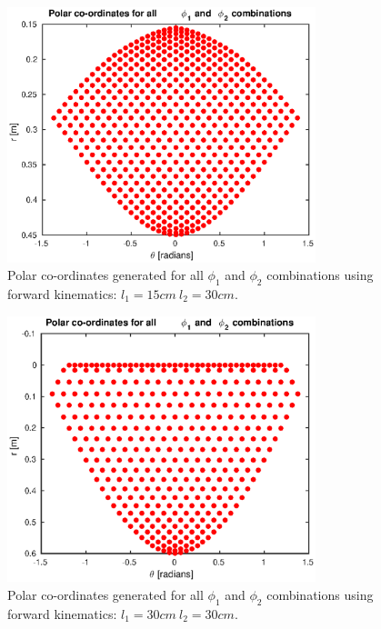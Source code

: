 \begin{figure}
\centering
\includegraphics[width=0.8\textwidth]{images/geometry/forward-kinematic-leg-positions.eps}
\caption{Polar co-ordinates generated for all $\phi_1$ and $\phi_2$ combinations using forward kinematics: $l_1 = 15cm\ l_2 = 30cm$.}
\label{fig:Polar co-ordinates generated 15-30}
\end{figure}

\begin{figure}
\centering
\includegraphics[width=0.8\textwidth]{images/geometry/forward-kinematic-leg-positions-30-30.eps}
\caption{Polar co-ordinates generated for all $\phi_1$ and $\phi_2$ combinations using forward kinematics: $l_1 = 30cm\ l_2 = 30cm$.}
\label{fig:Polar co-ordinates generated 30-30}
\end{figure}

